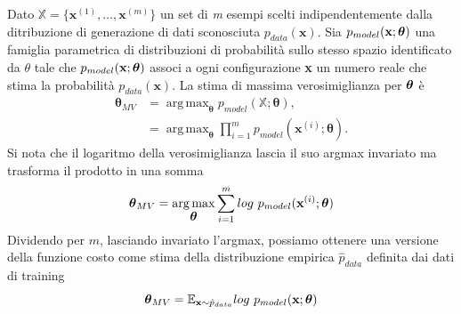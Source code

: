 \documentclass[12pt,a4paper]{report}
\newcommand{\argmax}{\mathop{\mathrm{arg\,max}}}
\begin{document}
    Dato $\mathbb{X}=\{\textbf{x}^{(1)}, \dots, \textbf{x}^{(m)}\}$ un 
    set di \textit{m} esempi scelti indipendentemente dalla ditribuzione
    di generazione di dati sconosciuta $p_{data}(\textbf{x})$. Sia 
    $p_{model}(\textbf{x};\mbox{\boldmath{$\theta$}})$ una famiglia 
    parametrica di distribuzioni di probabilit\`a sullo stesso spazio 
    identificato da $\theta$ tale che 
    $p_{model}(\textbf{x};\mbox{\boldmath{$\theta$}})$ associ a ogni
    configurazione \textbf{x} un numero reale che stima la probabilit\`a
    $p_{data}(\textbf{x})$. La stima di massima verosimiglianza per 
    $\mbox{\boldmath{$\theta$}}$ \`e
    \begin{align}
        \boldsymbol{\theta}_{MV} &= \argmax_{\boldsymbol{\theta}} p_{model}(\mathbb{X}; \boldsymbol{\theta}), \\ 
        &= \argmax_{\boldsymbol{\theta}} \prod\limits_{i=1}^m p_{model}(\textbf{x}^{(i)}; \boldsymbol{\theta}).
    \end{align}
    Si nota che il logaritmo della verosimiglianza lascia il suo argmax
    invariato ma trasforma il prodotto in una somma
    \begin{equation}
        \mbox{\boldmath{$\theta$}}_{MV} = \argmax_{\mbox{\boldmath{$\theta$}}}\sum\limits_{i=1}^mlog\ p_{model}(\textbf{x}^{(i)};{\mbox{\boldmath{$\theta$}}})
    \end{equation}
    Dividendo per $m$, lasciando invariato l'argmax, possiamo ottenere 
    una versione della funzione costo come stima della distribuzione 
    empirica $\hat{p}_{data}$ definita dai dati di training
    \begin{equation}
        \mbox{\boldmath{$\theta$}}_{MV} = \mathbb{E}_{\textbf{x}\sim\hat{p}_{data}}log\ p_{model}(\textbf{x};{\mbox{\boldmath{$\theta$}}})
    \end{equation}
    
\end{document}
